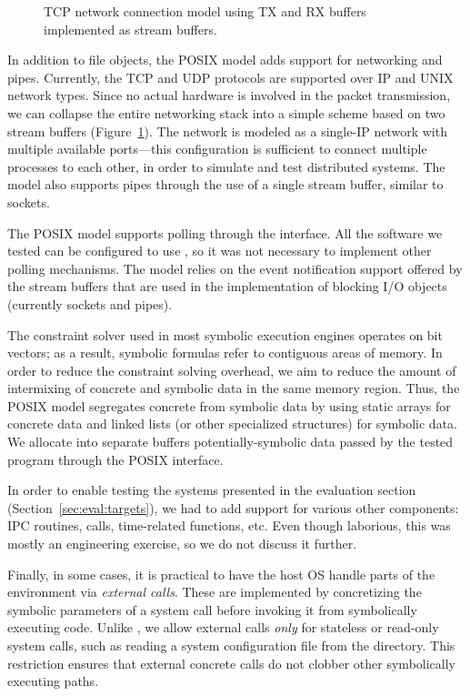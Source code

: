 \begin{figure}
  \centering
  \caption{TCP network connection model using TX and RX buffers implemented as stream buffers.}
  \label{fig:networkmodel}
\end{figure}

In addition to file objects, the POSIX model adds support for networking and pipes.
%
Currently, the TCP and UDP protocols are supported over IP and UNIX network types. Since no actual hardware is involved in the packet transmission, we can collapse the entire networking stack into a simple scheme based on two stream buffers (Figure~\ref{fig:networkmodel}). The network is modeled as a single-IP network with multiple available ports---this configuration is sufficient to connect multiple processes to each other, in order to simulate and test distributed systems. The model also supports pipes through the use of a single stream buffer, similar to sockets.

The POSIX model supports polling through the  interface.
%
All the software we tested can be configured to use , so it was not necessary to implement other polling mechanisms.  The  model relies on the event notification support offered by the stream buffers that are used in the implementation of blocking I/O objects (currently sockets and pipes).

The constraint solver used in most symbolic execution engines operates on bit vectors; as a result, symbolic formulas refer to contiguous areas of memory.
%
In order to reduce the constraint solving overhead, we aim to reduce the amount of intermixing of concrete and symbolic data in the same memory region.  Thus, the POSIX model segregates concrete from symbolic data by using static arrays for concrete data and linked lists (or other specialized structures) for symbolic data.  We allocate into separate buffers potentially-symbolic data passed by the tested program through the POSIX interface.

In order to enable testing the systems presented in the evaluation section (Section~\ref{sec:eval:targets}), we had to add support for various other components: IPC routines,  calls, time-related functions, etc.
%
Even though laborious, this was mostly an engineering exercise, so we do not discuss it further.

Finally, in some cases, it is practical to have the host OS handle parts of the environment via \emph{external calls}.
%
These are implemented by concretizing the symbolic parameters of a system call before invoking it from symbolically executing code. Unlike \cite{dart,klee,exe}, we allow external calls \emph{only} for stateless or read-only system calls, such as reading a system configuration file from the  directory.  This restriction ensures that external concrete calls do not clobber other symbolically executing paths.

